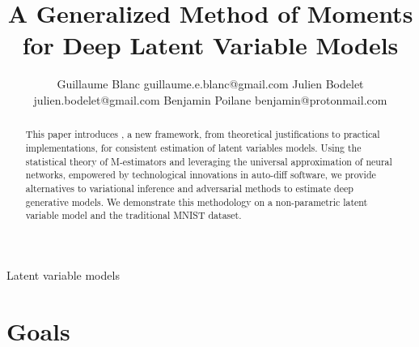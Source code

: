 \documentclass[twoside,11pt]{article}
\newcommand{\gb}[2][]{\todo[color=gbcolor, caption={GB}, #1]{#2}}
\begin{document}
\title{A Generalized Method of Moments for Deep Latent Variable Models}

\author{\name Guillaume Blanc \email guillaume.e.blanc@gmail.com
  \AND
  \name Julien Bodelet \email julien.bodelet@gmail.com
  \AND
  \name Benjamin Poilane \email benjamin@protonmail.com 
}


\maketitle

\begin{abstract}%
This paper introduces \gb[]{find good name}, a new framework, from theoretical justifications to practical implementations, for consistent estimation of latent variables models. Using the statistical theory of M-estimators and leveraging the universal approximation of neural networks, empowered by technological innovations in auto-diff software, we provide alternatives to variational inference and adversarial methods to estimate deep generative models. We demonstrate this methodology on a non-parametric latent variable model and the traditional MNIST dataset.
\end{abstract}

\begin{keywords}
Latent variable models
\end{keywords}

\newpage
\section*{Goals}
\end{document}
